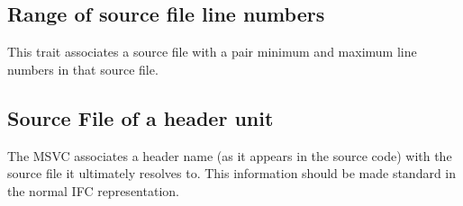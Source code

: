 

\subsection{Range of source file line numbers}
\label{sec:ifc-msvc-source-file-line-range-trait}

This trait associates a source file with a pair minimum and maximum line numbers in that source file.



\subsection{Source File of a header unit}
\label{sec:ifc-msvc-header-unit-source-file-trait}

The MSVC associates a header name (as it appears in the source code) with the source file it ultimately resolves to.
This information should be made standard in the normal IFC representation.


